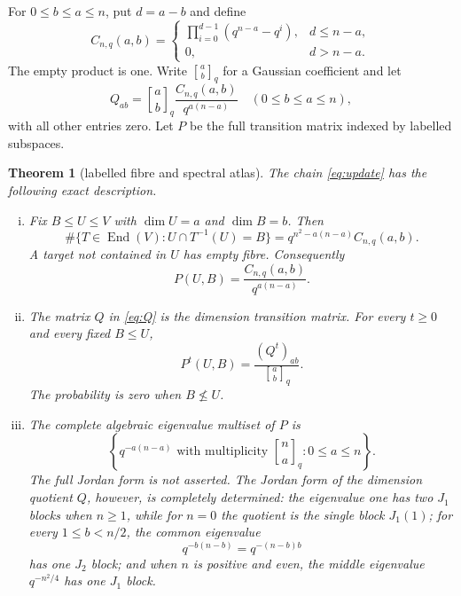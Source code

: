 \documentclass[a4paper,10pt]{amsart}
\newtheorem{theorem}{Theorem}
\theoremstyle{remark}
\newcommand{\End}{\operatorname{End}}
\newcommand{\qbinom}[2]{\genfrac{[}{]}{0pt}{}{#1}{#2}_{q}}
\begin{document}
For $0\le b\le a\le n$, put $d=a-b$ and define
\begin{equation}\label{eq:C}
 C_{n,q}(a,b)=
 \begin{cases}
 \displaystyle\prod_{i=0}^{d-1}(q^{n-a}-q^i),&d\le n-a,\\[2mm]
 0,&d>n-a.
 \end{cases}
\end{equation}
The empty product is one.  Write $\qbinom ab$ for a Gaussian coefficient and
let
\begin{equation}\label{eq:Q}
 Q_{ab}=\qbinom ab\frac{C_{n,q}(a,b)}{q^{a(n-a)}}
 \quad(0\le b\le a\le n),
\end{equation}
with all other entries zero.  Let $P$ be the full transition matrix indexed
by labelled subspaces.

\begin{theorem}[labelled fibre and spectral atlas]\label{thm:main}
The chain \eqref{eq:update} has the following exact description.
\begin{enumerate}[(i)]
\item Fix $B\le U\le V$ with $\dim U=a$ and $\dim B=b$.  Then
\begin{equation}\label{eq:ambient-fibre}
 \#\{T\in\End(V):U\cap T^{-1}(U)=B\}
 =q^{n^2-a(n-a)}C_{n,q}(a,b).
\end{equation}
A target not contained in $U$ has empty fibre.  Consequently
\begin{equation}\label{eq:one-step}
 P(U,B)=\frac{C_{n,q}(a,b)}{q^{a(n-a)}}.
\end{equation}

\item The matrix $Q$ in \eqref{eq:Q} is the dimension transition matrix.
For every $t\ge0$ and every fixed $B\le U$,
\begin{equation}\label{eq:alltime}
             P^t(U,B)=\frac{(Q^t)_{ab}}{\qbinom ab}.
\end{equation}
The probability is zero when $B\nleq U$.

\item The complete algebraic eigenvalue multiset of $P$ is
\begin{equation}\label{eq:spectrum}
 \left\{q^{-a(n-a)}\text{ with multiplicity }\qbinom na:
                                      0\le a\le n\right\}.
\end{equation}
The full Jordan form is not asserted.  The Jordan form of the dimension
quotient $Q$, however, is completely determined: the eigenvalue one has two
$J_1$ blocks when $n\ge1$, while for $n=0$ the quotient is the single block
$J_1(1)$; for every $1\le b<n/2$, the common eigenvalue
\begin{equation}\label{eq:paired-eigenvalue}
                 q^{-b(n-b)}=q^{-(n-b)b}
\end{equation}
has one $J_2$ block; and when $n$ is positive and even, the middle eigenvalue
$q^{-n^2/4}$ has one $J_1$ block.


\end{enumerate}
\end{theorem}
\end{document}
